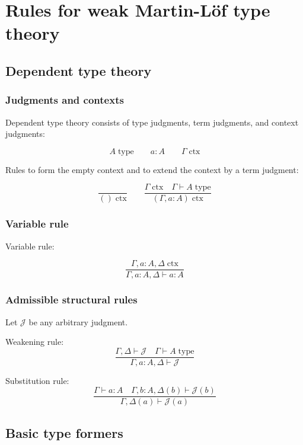 \documentclass{book}
\begin{document}
\tableofcontents

\chapter{Rules for weak Martin-Löf type theory}

\section{Dependent type theory}

\subsection{Judgments and contexts}

Dependent type theory consists of type judgments, term judgments, and context judgments:

$$A \; \mathrm{type} \qquad a:A \qquad \Gamma \; \mathrm{ctx}$$

Rules to form the empty context and to extend the context by a term judgment:

$$\frac{}{() \; \mathrm{ctx}} \qquad \frac{\Gamma \; \mathrm{ctx} \quad \Gamma \vdash A \; \mathrm{type}}{(\Gamma, a:A) \; \mathrm{ctx}}$$

\subsection{Variable rule}

Variable rule: 

$$\frac{\Gamma, a:A, \Delta \; \mathrm{ctx}}{\Gamma, a:A, \Delta \vdash a:A}$$

\subsection{Admissible structural rules}

Let $\mathcal{J}$ be any arbitrary judgment. 

Weakening rule:
$$\frac{\Gamma, \Delta \vdash \mathcal{J} \quad \Gamma \vdash A \; \mathrm{type}}{\Gamma, a:A, \Delta \vdash \mathcal{J}}$$

Substitution rule:
$$\frac{\Gamma \vdash a:A \quad \Gamma, b:A, \Delta(b) \vdash \mathcal{J}(b)}{\Gamma, \Delta(a) \vdash \mathcal{J}(a)}$$

\section{Basic type formers}
\end{document}
